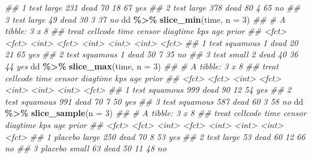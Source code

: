 \documentclass[
]{book}
\newenvironment{Shaded}{\begin{snugshade}}{\end{snugshade}}
\newcommand{\CommentTok}[1]{\textcolor[rgb]{0.56,0.35,0.01}{\textit{#1}}}
\newcommand{\DataTypeTok}[1]{\textcolor[rgb]{0.13,0.29,0.53}{#1}}
\newcommand{\DecValTok}[1]{\textcolor[rgb]{0.00,0.00,0.81}{#1}}
\newcommand{\KeywordTok}[1]{\textcolor[rgb]{0.13,0.29,0.53}{\textbf{#1}}}
\newcommand{\NormalTok}[1]{#1}
\newcommand{\OperatorTok}[1]{\textcolor[rgb]{0.81,0.36,0.00}{\textbf{#1}}}
\newcommand{\StringTok}[1]{\textcolor[rgb]{0.31,0.60,0.02}{#1}}
\begin{document}
\begin{Shaded}
\begin{Highlighting}[]
\CommentTok{\#\# 1 test  large      231 dead         70    18    67 yes  }
\CommentTok{\#\# 2 test  large      378 dead         80     4    65 no   }
\CommentTok{\#\# 3 test  large       49 dead         30     3    37 no}
\NormalTok{dd }\OperatorTok{\%\textgreater{}\%}\StringTok{ }\KeywordTok{slice\_min}\NormalTok{(time, }\DataTypeTok{n =} \DecValTok{3}\NormalTok{)}
\CommentTok{\#\# \# A tibble: 3 x 8}
\CommentTok{\#\#   treat cellcode  time censor diagtime   kps   age prior}
\CommentTok{\#\#   \textless{}fct\textgreater{} \textless{}fct\textgreater{}    \textless{}int\textgreater{} \textless{}fct\textgreater{}     \textless{}int\textgreater{} \textless{}int\textgreater{} \textless{}int\textgreater{} \textless{}fct\textgreater{}}
\CommentTok{\#\# 1 test  squamous     1 dead         20    21    65 yes  }
\CommentTok{\#\# 2 test  squamous     1 dead         50     7    35 no   }
\CommentTok{\#\# 3 test  small        2 dead         40    36    44 yes}
\NormalTok{dd }\OperatorTok{\%\textgreater{}\%}\StringTok{ }\KeywordTok{slice\_max}\NormalTok{(time, }\DataTypeTok{n =} \DecValTok{3}\NormalTok{)}
\CommentTok{\#\# \# A tibble: 3 x 8}
\CommentTok{\#\#   treat cellcode  time censor diagtime   kps   age prior}
\CommentTok{\#\#   \textless{}fct\textgreater{} \textless{}fct\textgreater{}    \textless{}int\textgreater{} \textless{}fct\textgreater{}     \textless{}int\textgreater{} \textless{}int\textgreater{} \textless{}int\textgreater{} \textless{}fct\textgreater{}}
\CommentTok{\#\# 1 test  squamous   999 dead         90    12    54 yes  }
\CommentTok{\#\# 2 test  squamous   991 dead         70     7    50 yes  }
\CommentTok{\#\# 3 test  squamous   587 dead         60     3    58 no}
\NormalTok{dd }\OperatorTok{\%\textgreater{}\%}\StringTok{ }\KeywordTok{slice\_sample}\NormalTok{(}\DataTypeTok{n =} \DecValTok{3}\NormalTok{)}
\CommentTok{\#\# \# A tibble: 3 x 8}
\CommentTok{\#\#   treat   cellcode  time censor diagtime   kps   age prior}
\CommentTok{\#\#   \textless{}fct\textgreater{}   \textless{}fct\textgreater{}    \textless{}int\textgreater{} \textless{}fct\textgreater{}     \textless{}int\textgreater{} \textless{}int\textgreater{} \textless{}int\textgreater{} \textless{}fct\textgreater{}}
\CommentTok{\#\# 1 placebo large      250 dead         70     8    53 yes  }
\CommentTok{\#\# 2 test    large       53 dead         60    12    66 no   }
\CommentTok{\#\# 3 placebo small       63 dead         50    11    48 no}
\end{Highlighting}
\end{Shaded}
\end{document}
